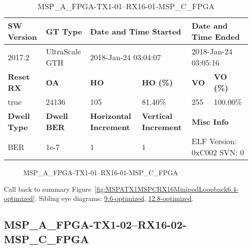 \begin{table}[h]
\centering
\caption{MSP\_A\_FPGA-TX1-01--RX16-01-MSP\_C\_FPGA}
\label{tab:MSPAFPGATX101RX1601MSPCFPGA6.4-optimized}
\begin{tabular}{@{}|l|l|l|l|l|l|@{}}
\toprule
\textbf{SW Version}                & \textbf{GT Type}   & \multicolumn{2}{l|}{\textbf{Date and Time Started}}            & \multicolumn{2}{l|}{\textbf{Date and Time Ended}}        \\ \midrule
2017.2                       & UltraScale GTH          & \multicolumn{2}{l|}{2018-Jan-24 03:04:07}                   & \multicolumn{2}{l|}{2018-Jan-24 03:05:16}               \\ \midrule
\textbf{Reset RX}                  & \textbf{OA} & \textbf{HO}   & \textbf{HO (\%)} & \textbf{VO} & \textbf{VO (\%)} \\ \midrule
true & 24136        & 105          & 81.40\%        & 255        & 100.00\%       \\ \midrule
\textbf{Dwell Type}                & \textbf{Dwell BER} & \textbf{Horizontal Increment} & \textbf{Vertical Increment}    & \multicolumn{2}{l|}{\textbf{Misc Info}}                  \\ \midrule
BER                            & 1e-7        & 1        & 1           & \multicolumn{2}{l|}{ELF Version: 0xC002 SVN: 0}                         \\ \bottomrule
\end{tabular}
\end{table}

\begin{figure}[h]
\caption{MSP\_A\_FPGA-TX1-01--RX16-01-MSP\_C\_FPGA} \label{fig:MSPAFPGATX101RX1601MSPCFPGA6.4-optimized}
\end{figure}

Call back to summary Figure~\ref{fig:MSPATX1MSPCRX16MinipodLoopback6.4-optimized}.
Sibling eye diagrams: \hyperref[sec:MSPAFPGATX101RX1601MSPCFPGA9.6-optimized]{9.6-optimized}, \hyperref[sec:MSPAFPGATX101RX1601MSPCFPGA12.8-optimized]{12.8-optimized}.

\clearpage
\newpage


\subsection{MSP\_A\_FPGA-TX1-02--RX16-02-MSP\_C\_FPGA}\label{sec:MSPAFPGATX102RX1602MSPCFPGA6.4-optimized}

